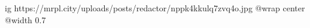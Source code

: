  
 
 
 
 

\ifcmt
  ig https://mrpl.city/uploads/posts/redactor/nppk4kkulq7zvq4o.jpg
  @wrap center
  @width 0.7
\fi
